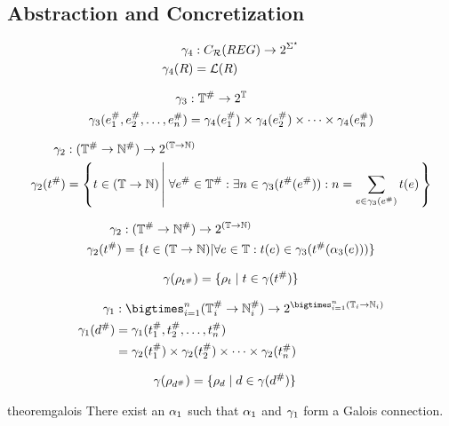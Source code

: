 \subsection{Abstraction and Concretization}\label{subsec:abstraction-and-concretization}

\begin{align}
    \gamma_4 &: C_{\mathcal{R}}(REG) \rightarrow 2^{\Sigma^\star} \\
    \gamma_4(R) &= \mathcal{L}(R)
\end{align}

\begin{align}
    \gamma_3 &: \mathbb{T}^\# \rightarrow 2^\mathbb{T} \\
    \gamma_3 (e_1^\#, e_2^\#, \dots, e_n^\#) &= \gamma_4(e_1^\#) \times \gamma_4(e_2^\#) \times \dots \times \gamma_4(e_n^\#)
\end{align}

\begin{align}
    \gamma_2 &: (\mathbb{T}^\# \rightarrow \mathbb{N}^\#) \rightarrow 2^{(\mathbb{T} \rightarrow \mathbb{N})} \\
    \gamma_2 (t^\#) &= \left\{ t \in (\mathbb{T} \rightarrow \mathbb{N}) \left|\; \forall e^\# \in \mathbb{T}^\# : \exists n \in \gamma_3(t^\#(e^\#)) : n = \sum_{e \in \gamma_3(e^\#)} t(e) \right. \right\}
\end{align}

\begin{align}
    \gamma_2 &: (\mathbb{T}^\# \rightarrow \mathbb{N}^\#) \rightarrow 2^{(\mathbb{T} \rightarrow \mathbb{N})} \\
    \gamma_2 (t^\#) &= \{ t \in (\mathbb{T} \rightarrow \mathbb{N}) | \forall e \in \mathbb{T} : t(e) \in \gamma_3(t^\#(\alpha_3(e))) \}
\end{align}

\begin{align}
    \gamma(\rho_{t^\#}) = \{ \rho_{t} \mid t \in \gamma(t^\#) \}
\end{align}

\begin{align}
    \concrete_1 &: \bigtimes_{i = 1}^{n} (\mathbb{T}^\#_i \rightarrow \mathbb{N}^\#_i) \rightarrow 2^{\bigtimes_{i = 1}^{n} (\mathbb{T}_i \rightarrow \mathbb{N}_i)} \\
    \concrete_1(d^\#) &= \concrete_1(t_1^\#, t_2^\#, \dots, t_n^\#) \\
                    &= \concrete_2(t_1^\#) \times \concrete_2(t_2^\#) \times \dots \times \concrete_2(t_n^\#)
\end{align}

\begin{align}
    \gamma(\rho_{d^\#}) &= \{ \rho_{d} \mid d \in \gamma(d^\#) \}
\end{align}

\begin{restatable}{theorem}{galois}\label{thm:galios}
    There exist an $\alpha_1$ such that $\alpha_1$ and $\gamma_1$ form a Galois connection.
\end{restatable}

